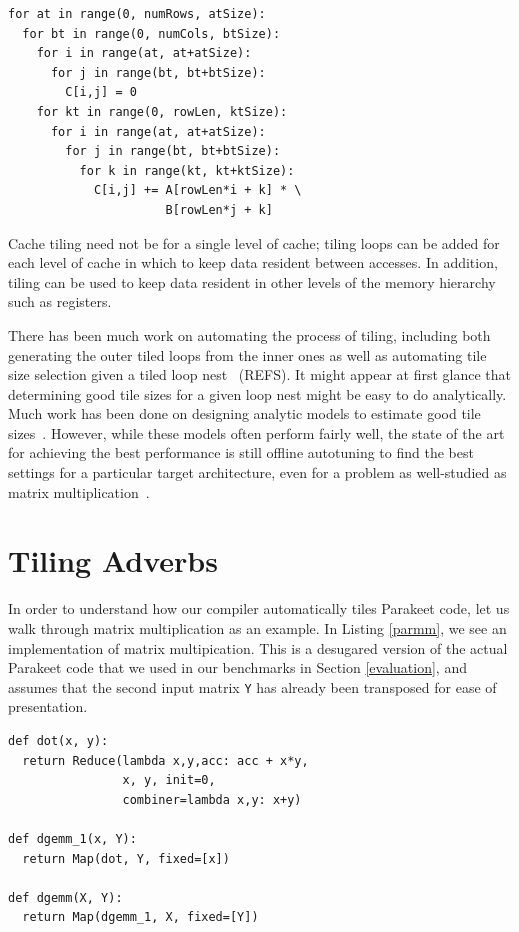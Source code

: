 \documentclass[preprint,9pt]{sigplanconf}
\begin{document}
\begin{lstlisting}[frame=single, label=tiledmm, caption={Tiled Matrix Multiply}, belowskip=0.5em]
for at in range(0, numRows, atSize):
  for bt in range(0, numCols, btSize):
    for i in range(at, at+atSize):
      for j in range(bt, bt+btSize):
        C[i,j] = 0
    for kt in range(0, rowLen, ktSize):
      for i in range(at, at+atSize):
        for j in range(bt, bt+btSize):
          for k in range(kt, kt+ktSize):
            C[i,j] += A[rowLen*i + k] * \
                      B[rowLen*j + k]
\end{lstlisting}

Cache tiling need not be for a single level of cache; tiling loops can be added for each level of cache in which to keep data resident between accesses.  In addition, tiling can be used to keep data resident in other levels of the memory hierarchy such as registers.

There has been much work on automating the process of tiling, including both generating the outer tiled loops from the inner ones as well as automating tile size selection given a tiled loop nest~\cite{Lam91, Wolf91} (REFS).  It might appear at first glance that determining good tile sizes for a given loop nest might be easy to do analytically.  Much work has been done on designing analytic models to estimate good tile sizes~\cite{Cole95, Shir12, Yoto03, Yoto05}.  However, while these models often perform fairly well, the state of the art for achieving the best performance is still offline autotuning to find the best settings for a particular target architecture, even for a problem as well-studied as matrix multiplication~\cite{Whal00}.

\section{Tiling Adverbs}
\label{tiling_transform}

In order to understand how our compiler automatically tiles Parakeet code, let us walk through matrix multiplication as an example.  In Listing \ref{parmm}, we see an implementation of matrix multipication.  This is a desugared version of the actual Parakeet code that we used in our benchmarks in Section \ref{evaluation}, and assumes that the second input matrix \lstinline{Y} has already been transposed for ease of presentation.

\begin{lstlisting}[label=parmm, caption={Parakeet Matrix Multiply}, belowskip=0.5em]
def dot(x, y):
  return Reduce(lambda x,y,acc: acc + x*y,
                x, y, init=0,
                combiner=lambda x,y: x+y)

def dgemm_1(x, Y):
  return Map(dot, Y, fixed=[x])
                
def dgemm(X, Y):
  return Map(dgemm_1, X, fixed=[Y])
\end{lstlisting}
\end{document}
